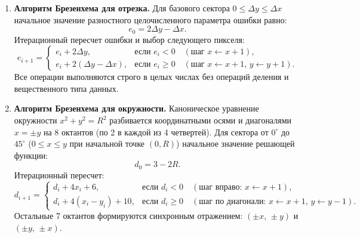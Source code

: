 \documentclass[11pt,a4paper]{article}
\begin{document}
\begin{enumerate}
    \item \textbf{Алгоритм Брезенхема для отрезка.} Для базового сектора $0 \le \Delta y \le \Delta x$ начальное значение разностного целочисленного параметра ошибки равно:
    \begin{equation}
        e_0 = 2\Delta y - \Delta x.
    \end{equation}
    Итерационный пересчет ошибки и выбор следующего пикселя:
    \begin{equation}
        e_{i+1} = \begin{cases}
            e_i + 2\Delta y, & \text{если } e_i < 0 \quad (\text{шаг } x \leftarrow x + 1), \\
            e_i + 2(\Delta y - \Delta x), & \text{если } e_i \ge 0 \quad (\text{шаг } x \leftarrow x + 1, \, y \leftarrow y + 1).
        \end{cases}
    \end{equation}
    Все операции выполняются строго в целых числах без операций деления и вещественного типа данных.

    \item \textbf{Алгоритм Брезенхема для окружности.} Каноническое уравнение окружности $x^2 + y^2 = R^2$ разбивается координатными осями и диагоналями $x = \pm y$ на 8 октантов (по 2 в каждой из 4 четвертей). Для сектора от $0^\circ$ до $45^\circ$ ($0 \le x \le y$ при начальной точке $(0, R)$) начальное значение решающей функции:
    \begin{equation}
        d_0 = 3 - 2R.
    \end{equation}
    Итерационный пересчет:
    \begin{equation}
        d_{i+1} = \begin{cases}
            d_i + 4x_i + 6, & \text{если } d_i < 0 \quad (\text{шаг вправо: } x \leftarrow x + 1), \\
            d_i + 4(x_i - y_i) + 10, & \text{если } d_i \ge 0 \quad (\text{шаг по диагонали: } x \leftarrow x + 1, \, y \leftarrow y - 1).
        \end{cases}
    \end{equation}
    Остальные 7 октантов формируются синхронным отражением: $(\pm x, \, \pm y)$ и $(\pm y, \, \pm x)$.
\end{enumerate}

\newpage

\end{document}
